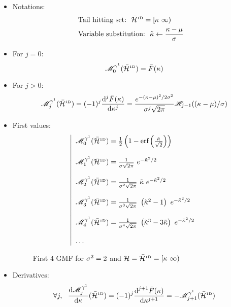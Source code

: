 \documentclass[a4paper,12pt]{article}
\begin{document}
\begin{itemize}
\item Notations:
  \begin{subequations}
    \begin{flalign}
      & \text{Tail hitting set:} \ \ \bar{\mathcal{H}}^{\text{\tiny1D}}=[\kappa\ \infty) & \\
      & \text{Variable substitution:} \ \ \tilde{\kappa} \leftarrow \frac{\kappa-\mu}{\sigma} &
    \end{flalign}
  \end{subequations}
\item For $j=0$:
\begin{equation}
  \mathscr{M}^{\gamma^1}_0(\bar{\mathcal{H}}^{\text{\tiny1D}})=\bar{F}(\kappa)
\end{equation}
\item For $j>0$:
\begin{equation}
  \mathscr{M}^{\gamma^1}_j(\bar{\mathcal{H}}^{\text{\tiny1D}})=(-1)^j\frac{\text{d}^j\bar{F}(\kappa)}{\text{d}\kappa^j}=\frac{e^{-(\kappa-\mu)^2/2\sigma^2}}{\sigma^j\sqrt{2\pi}}\mathscr{H}_{j-1}((\kappa-\mu)/\sigma)
\end{equation}
\item First values:
\begin{equation}
  \left|
  \begin{array}{l}
    \GMFa_0(\HST) = \frac{1}{2}\left(1-\erf\left(\frac{\clset}{\sqrt{2}}\right)\right) \\ \\
    \GMFa_1(\HST) = \frac{1}{\std  \sqrt{2\pi}}\ e^{-\clset^2/2} \\ \\
    \GMFa_2(\HST) = \frac{1}{\std^2\sqrt{2\pi}}\ \clset \ e^{-\clset^2/2} \\ \\
    \GMFa_3(\HST) = \frac{1}{\std^3\sqrt{2\pi}}\ \left(\clset^2-1\right) \ e^{-\clset^2/2} \\ \\
    \GMFa_4(\HST) = \frac{1}{\std^4\sqrt{2\pi}}\ \left(\clset^3-3\clset\right) \ e^{-\clset^2/2} \\ \\
    \dots
  \end{array}
  \right.
\end{equation}
\begin{figure}[!h]
  \scalebox{0.9}{}
  \caption{First 4 GMF for $\sigma^2=2$ and $\mathcal{H}=\bar{\mathcal{H}}^{\text{\tiny1D}}=[\kappa\ \infty)$}
\end{figure}
\item Derivatives:
\begin{equation}
  \forall j, \ \ \frac{\text{d}\GMFa_j}{\text{d}\lset}(\HST)=(-1)^j\frac{\text{d}^{j+1}\TP(\lset)}{\text{d}\lset^{j+1}}=-\GMFa_{j+1}(\HST)
\end{equation}
\end{itemize}
\end{document}
